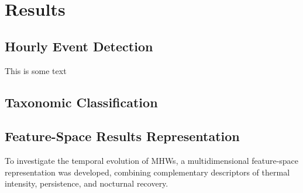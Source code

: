 \section{Results}
\clearpage
\subsection{Hourly Event Detection}
This is some text

% 
% 
% 
% 
% 
% 












\clearpage
\subsection{Taxonomic Classification}
\subsection{Feature-Space Results Representation}
To investigate the temporal evolution of MHWs, a multidimensional feature-space representation was developed, combining complementary descriptors of thermal intensity, persistence, and nocturnal recovery. %

